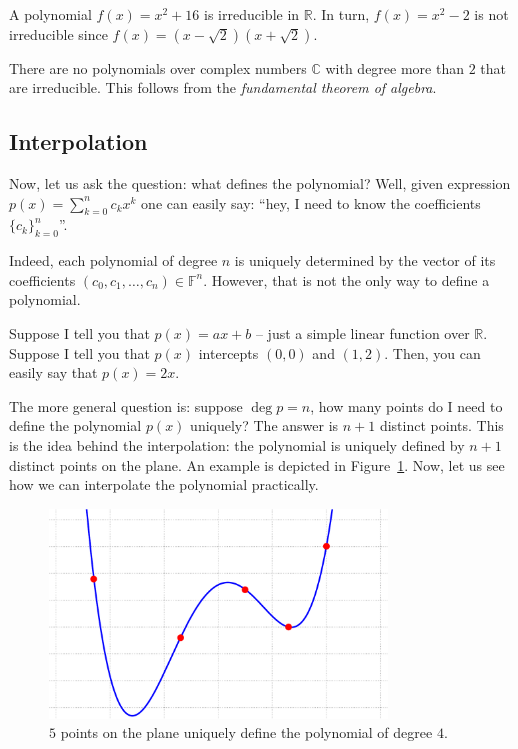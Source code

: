 \documentclass[../lecture-notes-148x210.tex]{subfiles}
\begin{document}
\begin{example}
    A polynomial $f(x) = x^2+16$ is irreducible in $\mathbb{R}$. In turn, $f(x) = x^2-2$ is not irreducible since $f(x) = (x-\sqrt{2})(x+\sqrt{2})$. 
\end{example}

\begin{example}
    There are no polynomials over complex numbers $\mathbb{C}$ with degree more than $2$ that are irreducible. This follows from the \textit{fundamental theorem of algebra}.
\end{example}

\subsection{Interpolation}

Now, let us ask the question: what defines the polynomial? Well, given expression $p(x) = \sum_{k=0}^n c_kx^k$ one can easily say: ``hey, I need to know the coefficients $\{c_k\}_{k=0}^n$''.

Indeed, each polynomial of degree $n$ is uniquely determined by the vector of its coefficients $(c_0,c_1,\dots,c_n) \in \mathbb{F}^n$. However, that is not the only way to define a polynomial.

Suppose I tell you that $p(x) = ax + b$ -- just a simple linear function over $\mathbb{R}$. Suppose I tell you that $p(x)$ intercepts $(0,0)$ and $(1,2)$. Then, you can easily say that $p(x) = 2x$. 

The more general question is: suppose $\deg p = n$, how many points do I need to define the polynomial $p(x)$ uniquely? The answer is $n+1$ distinct points. This is the idea behind the interpolation:
the polynomial is uniquely defined by $n+1$ distinct points on the plane. An example is depicted 
in Figure~\ref{fig:interpolation}. Now, let us see how we can interpolate the polynomial practically.

\begin{figure}[H]
    \centering
    \includegraphics[width=0.8\textwidth]{images/lecture_1/interpolation.pdf}
    \caption{$5$ points on the plane uniquely define the polynomial of degree $4$.}
    \label{fig:interpolation}
\end{figure}
\end{document}
